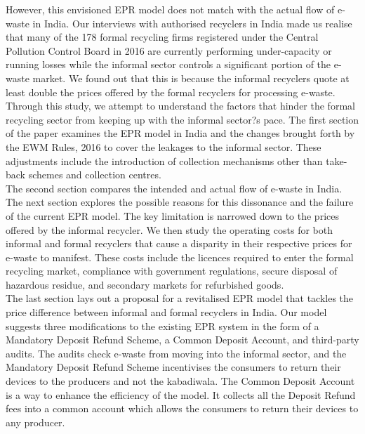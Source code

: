 \documentclass[a4paper, 12pt]{article}
\begin{document}
                    However, this envisioned EPR model does not match with the actual flow of e-waste in India. Our interviews with authorised recyclers in India made us realise that many of the 178 formal recycling firms registered under the Central Pollution Control Board in 2016 are currently performing under-capacity or running losses while the informal sector controls a significant portion of the e-waste market. We found out that this is because the informal recyclers quote at least double the prices offered by the formal recyclers for processing e-waste. Through this study, we attempt to understand the factors that hinder the formal recycling sector from keeping up with the informal sector?s pace. 
                    The first section of the paper examines the EPR model in India and the changes brought forth by the EWM Rules, 2016 to cover the leakages to the informal sector. These adjustments include the introduction of collection mechanisms other than take-back schemes and collection centres. \\
                    
                    The second section compares the intended and actual flow of e-waste in India. The next section explores the possible reasons for this dissonance and the failure of the current EPR model. The key limitation is narrowed down to the prices offered by the informal recycler. We then study the operating costs for both informal and formal recyclers that cause a disparity in their respective prices for e-waste to manifest. These costs include the licences required to enter the formal recycling market, compliance with government regulations, secure disposal of hazardous residue, and secondary markets for refurbished goods. \\
                    
                    The last section lays out a proposal for a revitalised EPR model that tackles the price difference between informal and formal recyclers in India. Our model suggests three modifications to the existing EPR system in the form of a Mandatory Deposit Refund Scheme, a Common Deposit Account, and third-party audits. The audits check e-waste from moving into the informal sector, and the Mandatory Deposit Refund Scheme incentivises the consumers to return their devices to the producers and not the kabadiwala. The Common Deposit Account is a way to enhance the efficiency of the model. It collects all the Deposit Refund fees into a common account which allows the consumers to return their devices to any producer. \\
                    
\end{document}
